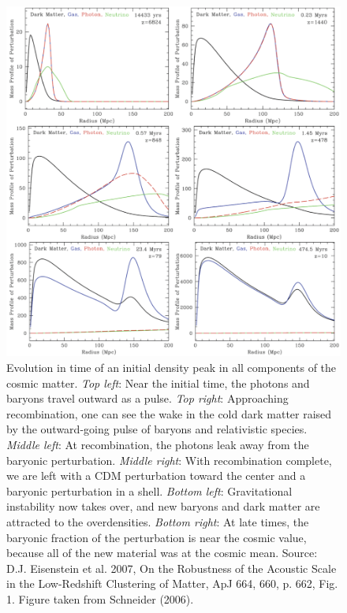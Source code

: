 \documentclass[a4paper,11pt]{article}
\begin{document}
\begin{figure}[t!]
    \includegraphics[width=15cm]{figures/PerturbationEvolution.png}
    \centering
    \caption{\footnotesize{Evolution in time of an initial density peak in all components of the cosmic matter. \textit{Top left}: Near the initial time, the photons and baryons travel outward as a pulse. \textit{Top right}: Approaching recombination, one can see the wake in the cold dark matter raised by the outward-going pulse of baryons and relativistic species. \textit{Middle left}: At recombination, the photons leak away from the baryonic perturbation. \textit{Middle right}: With recombination complete, we are left with a CDM perturbation toward the center and a baryonic perturbation in a shell. \textit{Bottom left}: Gravitational instability now takes over, and new baryons and dark matter are attracted to the overdensities. \textit{Bottom right}: At late times, the baryonic fraction of the perturbation is near the cosmic value, because all of the new material was at the cosmic mean. Source: D.J. Eisenstein et al. 2007, On the Robustness of the Acoustic Scale in the Low-Redshift Clustering of Matter, ApJ 664, 660, p. 662, Fig. 1. Figure taken from Schneider (2006).}}
    \label{fig:perturbationevolution}
\end{figure}
\end{document}
